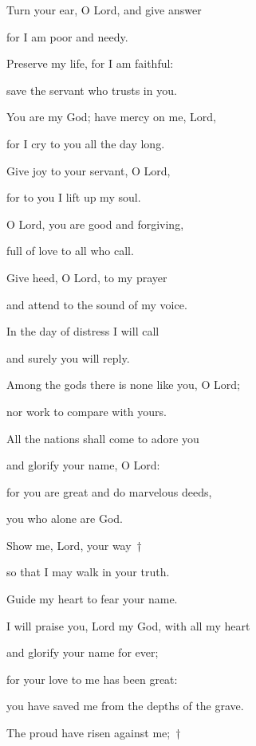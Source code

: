 \noindent Turn your ear, O Lord, and give answer~\GreStar{}~\nopagebreak

for I am poor and needy.

\noindent Preserve my life, for I am faithful:~\GreStar{}~\nopagebreak

save the servant who trusts in you.

\noindent You are my God; have mercy on me, Lord,~\GreStar{}~\nopagebreak

for I cry to you all the day long.

\noindent Give joy to your servant, O Lord,~\GreStar{}~\nopagebreak

for to you I lift up my soul.

\noindent O Lord, you are good and forgiving,~\GreStar{}~\nopagebreak

full of love to all who call.

\noindent Give heed, O Lord, to my prayer~\GreStar{}~\nopagebreak

and attend to the sound of my voice.

\noindent In the day of distress I will call~\GreStar{}~\nopagebreak

and surely you will reply.

\noindent Among the gods there is none like you, O Lord;~\GreStar{}~\nopagebreak

nor work to compare with yours.

\noindent All the nations shall come to adore you~\GreStar{}~\nopagebreak

and glorify your name, O Lord:

\noindent for you are great and do marvelous deeds,~\GreStar{}~\nopagebreak

you who alone are God.

\noindent Show me, Lord, your way~†~\nopagebreak

so that I may walk in your truth.~\GreStar{}~\nopagebreak

Guide my heart to fear your name.

\noindent I will praise you, Lord my God, with all my heart~\GreStar{}~\nopagebreak

and glorify your name for ever;

\noindent for your love to me has been great:~\GreStar{}~\nopagebreak

you have saved me from the depths of the grave.

\noindent The proud have risen against me;~†~\nopagebreak

